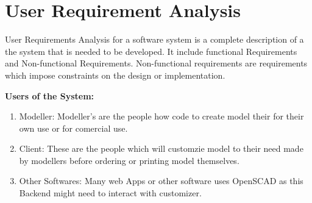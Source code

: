 \section{User Requirement Analysis} 
User Requirements Analysis for a software system is a complete description of a the system that is needed to be developed. It include functional Requirements
and Non-functional Requirements. Non-functional requirements are 
requirements which impose constraints on the design or implementation.

 
{\bf Users of the System:}
	\begin{enumerate}
		\item Modeller: Modeller's are the people how code to create model their for their own use or for comercial use.
		\item Client: These are the people which will customzie model to their need made by modellers before ordering or printing model themselves. 
		\item Other Softwares: Many web Apps or other software uses OpenSCAD as this Backend might need to interact with customizer.
		 		
	\end{enumerate}

